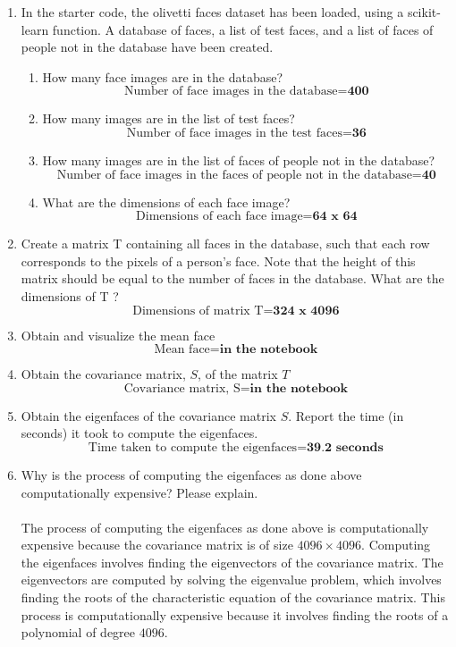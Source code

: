 \documentclass[12pt]{extarticle} %
\begin{document}
\begin{enumerate}
    \item In the starter code, the olivetti faces dataset has been loaded, using a scikit-learn function. A database
    of faces, a list of test faces, and a list of faces of people not in the database have been created.
    \begin{enumerate}
        \item How many face images are in the database? 
        \[
        \text{Number of face images in the database} = \textbf{400}
        \]
        \item How many images are in the list of test faces?
        \[
        \text{Number of face images in the test faces} = \textbf{36}
        \]
        \item How many images are in the list of faces of people not in the database?
        \[
        \text{Number of face images in the faces of people not in the database} = \textbf{40}
        \]
        \item What are the dimensions of each face image?
        \[
        \text{Dimensions of each face image} = \textbf{64 x 64}
        \]
    \end{enumerate}    
    \item Create a matrix T containing all faces in the database, such that each row corresponds to the pixels
    of a person’s face. Note that the height of this matrix should be equal to the number of faces in the
    database. What are the dimensions of T ?
    \[
    \text{Dimensions of matrix T} = \textbf{324 x 4096} 
    \]
    \item Obtain and visualize the mean face
    \[
    \text{Mean face} = \textbf{in the notebook}
    \]
    \item Obtain the covariance matrix, \(S\), of the matrix \(T\)
    \[
        \text{Covariance matrix, S} = \textbf{in the notebook}
    \]
    \item Obtain the eigenfaces of the covariance matrix \(S\). Report the time (in seconds) it took to compute the eigenfaces.
   \[
   \text{Time taken to compute the eigenfaces} = \textbf{39.2 seconds}
   \]
    \item  Why is the process of computing the eigenfaces as done above computationally expensive? Please
    explain.
    \\\\ The process of computing the eigenfaces as done above is computationally expensive because the covariance matrix is of size \(4096 \times 4096\). Computing the eigenfaces involves finding the eigenvectors of the covariance matrix. The eigenvectors are computed by solving the eigenvalue problem, which involves finding the roots of the characteristic equation of the covariance matrix. This process is computationally expensive because it involves finding the roots of a polynomial of degree \(4096\).

\end{enumerate}
\end{document}
